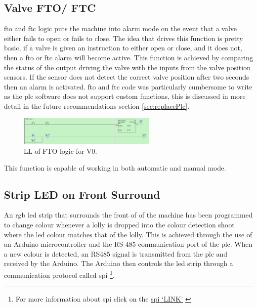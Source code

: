     \subsection{Valve FTO/ FTC} \label{sec:valveFtoFtc}
        \acrfull{fto} and \acrfull{ftc} logic puts the machine into alarm mode on the event that a valve either fails to open or fails to close. The idea that drives this function is pretty basic, if a valve is given an instruction to either open or close, and it does not, then a \acrshort{fto} or \acrshort{ftc} alarm will become active. This function is achieved by comparing the status of the output driving the valve with the inputs from the valve position sensors. If the sensor does not detect the correct valve position after two seconds then an alarm is activated. \acrshort{fto} and \acrshort{ftc} code was particularly cumbersome to write as the \acrshort{plc} software does not support custom functions, this is discussed in more detail in the future recommendations section \ref{sec:replacePlc}.

        \begin{figure}[H]
            \centering
            \includegraphics[width = 0.6\textwidth]{2_images/ftoLl}
            \caption{LL of FTO logic for V0.}
            \label{fig:ftoLl}
        \end{figure}          
        This function is capable of working in both automatic and manual mode.   
        
    \subsection{Strip LED on Front Surround}
        An \acrshort{rgb} \acrshort{led} strip that surrounds the front of of the machine has been programmed to change colour whenever a lolly is dropped into the colour detection shoot where the \acrshort{led} colour matches that of the lolly. This is achieved through the use of an Arduino microcontroller and the RS-485 communication port of the \acrshort{plc}. When a new colour is detected, an RS485 signal is transmitted from the \acrshort{plc} and received by the Arduino. The Arduino then controls the \acrshort{led} strip through a communication protocol called \acrshort{spi} \footnote{For more information about \acrshort{spi} click on the \href{https://learn.sparkfun.com/tutorials/serial-peripheral-interface-spi/all}{\acrshort{spi} `LINK'} \cite{spi}}.

